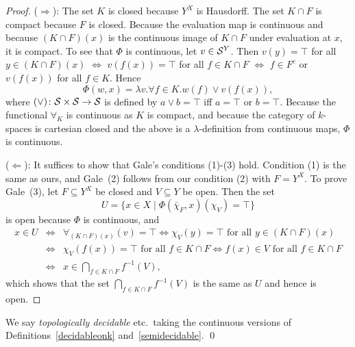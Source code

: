 \documentclass{LMCS}
\begin{document}
\begin{proof}
  ($\Rightarrow$): The set $K$ is closed because $Y^X$ is Hausdorff.
  The set $K \cap F$ is compact because $F$ is closed.  Because the
  evaluation map is continuous and because $(K \cap F)(x)$ is the
  continuous image of $K \cap F$ under evaluation at $x$, it is
  compact. To see that $\Phi$ is continuous, let $v \in \mathcal{S}^Y$.  Then
  $v(y)=\top$ for all $y \in (K\cap F)(x)$ $\iff$ $v(f(x))=\top$ for
  all $f \in K\cap F$ $\iff$ $f \in F^c$ or $v(f(x))$ for all $f \in K$.
  Hence \[ \Phi(w,x)=\lambda v.\forall f \in K.w(f) \vee v(f(x)), \]
  where $(\vee) \colon \mathcal{S} \times \mathcal{S} \to \mathcal{S}$ is defined by
  $a \vee b = \top$ iff $a=\top$ or $b=\top$.  Because the
  functional $\forall_K$ is continuous as $K$ is compact, and because
  the category of $k$-spaces is cartesian closed and the above is a
  $\lambda$-definition from continuous maps, $\Phi$ is
  continuous.

\medskip

 ($\Leftarrow$): It suffices to show that Gale's conditions (1)-(3)
 hold.  Condition (1) is the same as ours, and Gale~(2) follows from
 our condition (2) with $F=Y^X$. To prove Gale~(3), let $F \subseteq
 Y^X$ be closed and $V \subseteq Y$ be open. Then the set 
 \[ U = \{ x \in X \mid \Phi(\bar{\chi}_F,x)(\chi_V)=\top \} \]
 is open because $\Phi$ is continuous, and
 \begin{eqnarray*}
   x \in U 
  & \iff & \forall_{(K\cap F)(x)}(v)= \top 
    \iff  \text{$\chi_V(y) = \top$ for all $y \in (K \cap F)(x)$} \\
   & \iff & \text{$\chi_V(f(x)) = \top$ for all $f \in K \cap F$} 
    \iff  \text{$f(x) \in V$  for all $f \in K \cap F$}  \\
   & \iff & {\textstyle x \in \bigcap_{f \in K \cap F} f^{-1}(V)},
 \end{eqnarray*}
 which shows that the set $\bigcap_{f \in K \cap F} f^{-1}(V)$ is the
 same as $U$ and hence is open.
\end{proof}


\begin{defi}
We say \emph{topologically decidable} etc.\ taking
  the continuous versions of Definitions~\ref{decidableonk}
  and~\ref{semidecidable}. \qed
\end{defi}
\end{document}
